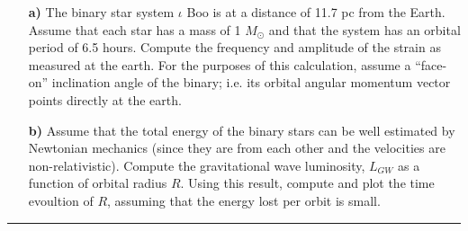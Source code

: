 \documentclass[11pt]{article}
\newcommand{\zach}[1]{\textcolor{ForestGreen}{#1}}
\begin{document}
\begin{enumerate}
\begin{itemize}
\item[\bf a)] The binary star system $\iota$ Boo is at a distance of
  11.7 pc from the Earth. Assume that each star has a mass of 1
  $M_{\odot}$ and that the system has an orbital period of 6.5
  hours. Compute the frequency and amplitude of the strain as measured
  at the earth. 
For the purposes of this calculation, assume a
  ``face-on'' inclination angle of the binary; i.e. its orbital
  angular momentum vector points directly at the earth.

\item[\bf b)] Assume that the total energy of the binary stars can
  be well estimated by Newtonian mechanics (since they are from each
  other and the velocities are non-relativistic). Compute the
  gravitational wave luminosity, $L_{GW}$ as a function of orbital
  radius $R$. Using this result, compute and plot the time evoultion
  of $R$, assuming that the energy lost per orbit is small.

\end{itemize}



  



\end{enumerate}

\bigskip
{\color{Sepia} \hrule}
\end{document}

